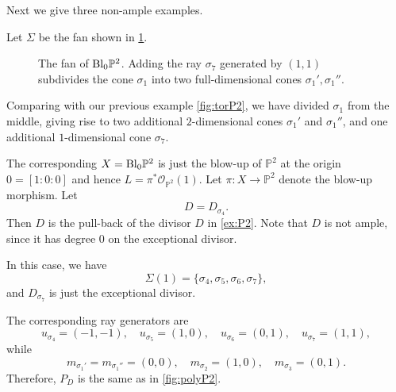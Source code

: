 Next we give three non-ample examples.
\begin{example}\label{ex:P2bl1pt}
    Let $\Sigma$ be the fan shown in \cref{fig:polyP2b1p}.
    \begin{figure}[ht]
        \centering
        \caption{The fan of $\mathrm{Bl}_0\mathbb{P}^2$. Adding the ray $\sigma_7$ generated by $(1,1)$ subdivides the cone $\sigma_1$ into two full-dimensional cones $\sigma_1',\sigma_1''$.}
        \label{fig:polyP2b1p}
    \end{figure}
    Comparing with our previous example \cref{fig:torP2}, we have divided $\sigma_1$ from the middle, giving rise to two additional $2$-dimensional cones $\sigma_1'$ and $\sigma_1''$, and one additional $1$-dimensional cone $\sigma_7$.

    The corresponding $X=\mathrm{Bl}_0 \mathbb{P}^2$ is just the blow-up of $\mathbb{P}^2$ at the origin $0=[1:0:0]$ and hence $L=\pi^*\mathcal{O}_{\mathbb{P}^2}(1)$. Let $\pi\colon X\rightarrow \mathbb{P}^2$ denote the blow-up morphism.
    Let
    \[
    D=D_{\sigma_4}.
    \]
    Then $D$ is the pull-back of the divisor $D$ in \cref{ex:P2}. Note that $D$ is not ample, since it has degree $0$ on the exceptional divisor.

    In this case, we have
    \[
    \Sigma(1)=\{\sigma_4,\sigma_5,\sigma_6,\sigma_7\},
    \]
    and $D_{\sigma_7}$ is just the exceptional divisor.

    The corresponding ray generators are
    \[
    u_{\sigma_4}=(-1,-1),\quad u_{\sigma_5}=(1,0),\quad u_{\sigma_6}=(0,1),\quad u_{\sigma_7}=(1,1),
    \]
    while
    \[
    m_{\sigma_1'}=m_{\sigma_1''}=(0,0),\quad m_{\sigma_2}=(1,0),\quad m_{\sigma_3}=(0,1).
    \]
    Therefore, $P_D$ is the same as in \cref{fig:polyP2}.


\end{example}
